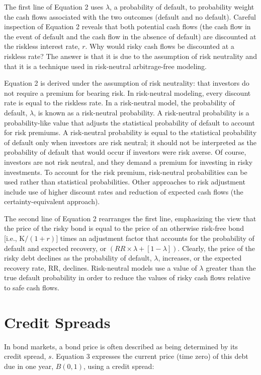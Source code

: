 \documentclass[11pt]{article}
\begin{document}
The first line of Equation 2 uses $\lambda$, a probability of default, to probability weight the cash flows associated with the two outcomes (default and no default). Careful inspection of Equation 2 reveals that both potential cash flows (the cash flow in the event of default and the cash flow in the absence of default) are discounted at the riskless interest rate, $r$. Why would risky cash flows be discounted at a riskless rate? The answer is that it is due to the assumption of risk neutrality and that it is a technique used in risk-neutral arbitrage-free modeling.

Equation 2 is derived under the assumption of risk neutrality: that investors do not require a premium for bearing risk. In risk-neutral modeling, every discount rate is equal to the riskless rate. In a risk-neutral model, the probability of default, $\lambda$, is known as a risk-neutral probability. A risk-neutral probability is a probability-like value that adjusts the statistical probability of default to account for risk premiums. A risk-neutral probability is equal to the statistical probability of default only when investors are risk neutral; it should not be interpreted as the probability of default that would occur if investors were risk averse. Of course, investors are not risk neutral, and they demand a premium for investing in risky investments. To account for the risk premium, risk-neutral probabilities can be used rather than statistical probabilities. Other approaches to risk adjustment include use of higher discount rates and reduction of expected cash flows (the certainty-equivalent approach).

The second line of Equation 2 rearranges the first line, emphasizing the view that the price of the risky bond is equal to the price of an otherwise risk-free bond [i.e., $\mathrm{K} /(1+r)]$ times an adjustment factor that accounts for the probability of default and expected recovery, or $(R R \times \lambda+[1-\lambda])$. Clearly, the price of the risky debt declines as the probability of default, $\lambda$, increases, or the expected recovery rate, RR, declines. Risk-neutral models use a value of $\lambda$ greater than the true default probability in order to reduce the values of risky cash flows relative to safe cash flows.

\section*{Credit Spreads}
In bond markets, a bond price is often described as being determined by its credit spread, $s$. Equation 3 expresses the current price (time zero) of this debt due in one year, $B(0,1)$, using a credit spread:
\end{document}
